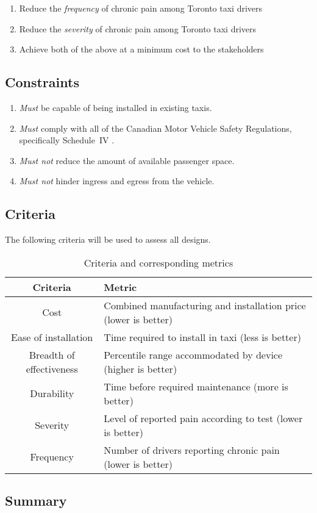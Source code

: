 \documentclass[11pt]{article}
\begin{document}
\begin{enumerate}
\item Reduce the \emph{frequency} of chronic pain among Toronto taxi drivers
\item Reduce the \emph{severity} of chronic pain among Toronto taxi drivers
\item Achieve both of the above at a minimum cost to the stakeholders
\end{enumerate}

\subsection{Constraints}
\begin{enumerate}
\item \emph{Must} be capable of being installed in existing taxis.
\item \emph{Must} comply with all of the Canadian Motor Vehicle Safety Regulations,
specifically Schedule~IV \cite{motorregs}.
\item \emph{Must not} reduce the amount of available passenger space.
\item \emph{Must not} hinder ingress and egress from the vehicle.
\end{enumerate}
\subsection{Criteria}
The following criteria will be used to assess all designs.
\begin{table}[h]
\centering
\caption{Criteria and corresponding metrics}
\begin{tabular}{c p{10cm} }
  Criteria & Metric \\ \hline
  Cost & Combined manufacturing and installation price (lower is better) \\
  Ease of installation & Time required to install in taxi (less is better) \\
  Breadth of effectiveness & Percentile range accommodated by device (higher is better) \\
  Durability & Time before required maintenance (more is better) \\
  Severity & Level of reported pain according to test (lower is better) \\
  Frequency & Number of drivers reporting chronic pain (lower is better)
\end{tabular}
\end{table}

\subsection{Summary}
\end{document}
